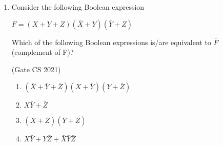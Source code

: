 \documentclass[12pt]{article}                         \usepackage{hyperref}                                 \usepackage{listings}
\date{\today}
\begin{document}
\maketitle{}

\begin{enumerate}
\item Consider the following Boolean expression 

            \begin{center}$F = (X+Y+Z)(\bar{X}+Y)(\bar{Y}+Z)$ \end{center}  
       
Which of the following Boolean expressions is/are equivalent to $\overline{F}$ (complement of 
 F)?
 
 \hfill{(Gate CS 2021)}
\begin{enumerate}                                     
\item $(\bar{X}+\bar{Y}+\bar{Z})(X+\bar{Y})(Y+\bar{Z})$
\item $X\bar{Y}+\bar{Z}$
\item $(X+\bar{Z})(\bar{Y}+\bar{Z})$
\item $X\bar{Y}+Y\bar{Z}+\bar{X}\bar{Y}\bar{Z}$ 
\end{enumerate}

\end{enumerate}
\end{document}
